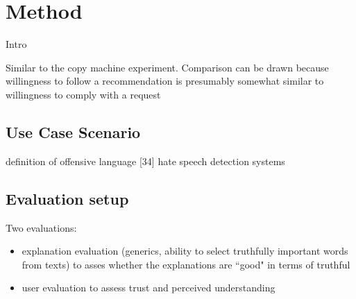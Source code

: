 \section{Method}
Intro

Similar to the copy machine experiment. Comparison can be drawn because willingness to follow a recommendation is presumably somewhat similar to willingness to comply with a request 

\subsection{Use Case Scenario}
definition of offensive language [34] \newline
hate speech detection systems \newline

\subsection{Evaluation setup}

Two evaluations: 
\begin{itemize}
	\item explanation evaluation (generics, ability to select truthfully important words from texts) to asses whether the explanations are ``good" in terms of truthful
	\item user evaluation to assess trust and perceived understanding
\end{itemize}







